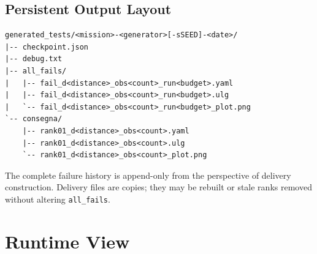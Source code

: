 \documentclass[11pt,a4paper]{report}
\newcommand{\code}[1]{\texttt{#1}}
\begin{document}
\subsection{Persistent Output Layout}
\begin{lstlisting}[language={}]
generated_tests/<mission>-<generator>[-sSEED]-<date>/
|-- checkpoint.json
|-- debug.txt
|-- all_fails/
|   |-- fail_d<distance>_obs<count>_run<budget>.yaml
|   |-- fail_d<distance>_obs<count>_run<budget>.ulg
|   `-- fail_d<distance>_obs<count>_run<budget>_plot.png
`-- consegna/
    |-- rank01_d<distance>_obs<count>.yaml
    |-- rank01_d<distance>_obs<count>.ulg
    `-- rank01_d<distance>_obs<count>_plot.png
\end{lstlisting}

The complete failure history is append-only from the perspective of delivery construction. Delivery files are copies; they may be rebuilt or stale ranks removed without altering \code{all\_fails}.

\section{Runtime View}
\end{document}
